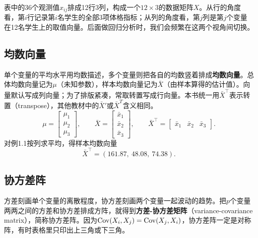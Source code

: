 表中的36个观测值$x_{ij}$排成12行3列，构成一个$12\times 3$的数据矩阵$X$。从行的角度看，第$i$行记录第$i$名学生的全部3项体格指标；从列的角度看，第$j$列是第$j$个变量在12名学生上的取值向量。后面做回归分析时，我们会频繁在这两个视角间切换。

\subsection{均数向量}
单个变量的平均水平用均数描述，多个变量则把各自的均数竖着排成\textbf{均数向量}。总体均数向量记为$\mu$（未知参数），样本均数向量记为$\bar X$（由样本算得的估计值）。向量默认写成列向量；为了排版紧凑，常取转置写成行向量。本书统一用$\bar X^\top$表示转置（transpose），其他教材中的$\bar X'$或$\bar X^T$含义相同。
\[
\mu=\begin{bmatrix}\mu_1\\\mu_2\\\mu_3\end{bmatrix},\qquad
\bar X=\begin{bmatrix}\bar x_1\\\bar x_2\\\bar x_3\end{bmatrix},\qquad
\bar X^\top=\begin{bmatrix}\bar x_1&\bar x_2&\bar x_3\end{bmatrix}.
\]
对例1.1按列求平均，得样本均数向量
\[
\bar X^\top=(161.87,\ 48.08,\ 74.38).
\]

\subsection{协方差阵}
方差刻画单个变量的离散程度，协方差刻画两个变量一起波动的趋势。把$p$个变量两两之间的方差和协方差排成方阵，就得到\textbf{方差-协方差矩阵}（variance-covariance matrix），简称协方差阵。因为$\operatorname{Cov}(X_i,X_j)=\operatorname{Cov}(X_j,X_i)$，协方差阵一定是对称阵，有时表格里只印出上三角或下三角。

